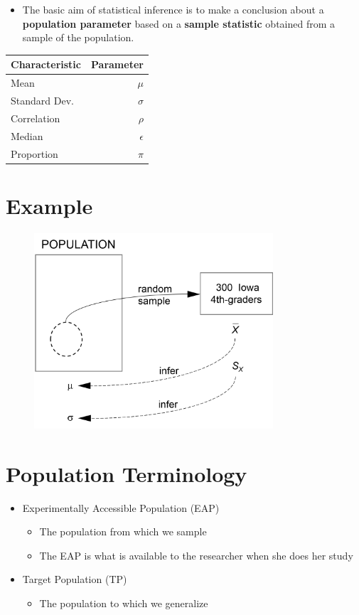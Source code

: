 \documentclass[12pt]{article}
\begin{document}
\begin{itemize}
\itemsep1pt\parskip0pt
\item
  The basic aim of statistical inference is to make a conclusion about a
  \textbf{population parameter} based on a \textbf{sample statistic}
  obtained from a sample of the population.
\end{itemize}

\begin{longtable}[c]{@{}lr@{}}
\toprule
Characteristic & Parameter\tabularnewline
\midrule
\endhead
Mean & \(\mu\)\tabularnewline
Standard Dev. & \(\sigma\)\tabularnewline
Correlation & \(\rho\)\tabularnewline
Median & \(\epsilon\)\tabularnewline
Proportion & \(\pi\)\tabularnewline
\bottomrule
\end{longtable}

\section{Example}\label{example}

\begin{figure}[H]
\centering
\includegraphics[width=3.5in]{itbs_infer.png}
\caption{}
\end{figure}

\section{Population Terminology}\label{population-terminology}

\begin{itemize}
\itemsep1pt\parskip0pt
\item
  Experimentally Accessible Population (EAP)

  \begin{itemize}
  \itemsep1pt\parskip0pt
  \item
    The population from which we sample
  \item
    The EAP is what is available to the researcher when she does her
    study
  \end{itemize}
\item
  Target Population (TP)

  \begin{itemize}
  \itemsep1pt\parskip0pt
  \item
    The population to which we generalize
  \end{itemize}
\end{itemize}
\end{document}
